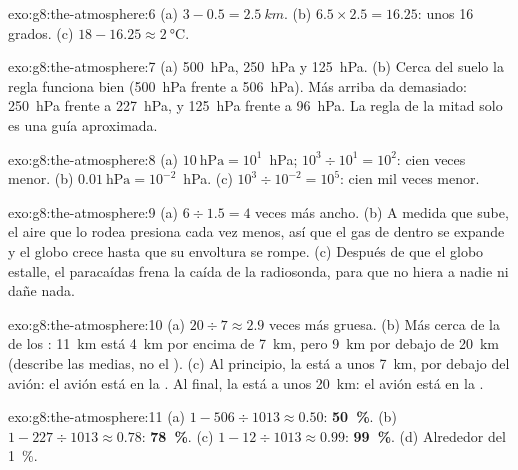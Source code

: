 \begin{solution}{exo:g8:the-atmosphere:6}
(a) $3 - 0.5 = \qty{2.5}{km}$. (b) $6.5 \times 2.5 = 16.25$: unos 16
grados. (c) $18 - 16.25 \approx \qty{2}{\degreeCelsius}$.
\end{solution}

\begin{solution}{exo:g8:the-atmosphere:7}
(a) \qty{500}{hPa}, \qty{250}{hPa} y \qty{125}{hPa}. (b) Cerca del suelo
la regla funciona bien (\qty{500}{hPa} frente a \qty{506}{hPa}). Más
arriba da demasiado: \qty{250}{hPa} frente a \qty{227}{hPa}, y
\qty{125}{hPa} frente a \qty{96}{hPa}. La regla de la mitad solo es una
guía aproximada.
\end{solution}

\begin{solution}{exo:g8:the-atmosphere:8}
(a) $10~\text{hPa} = 10^1$~hPa; $10^3 \div 10^1 = 10^2$: cien veces menor.
(b) $0.01~\text{hPa} = 10^{-2}$~hPa. (c) $10^3 \div 10^{-2} =
10^5$: cien mil veces menor.
\end{solution}

\begin{solution}{exo:g8:the-atmosphere:9}
(a) $6 \div 1.5 = 4$ veces más ancho. (b) A medida que sube, el aire que lo
rodea presiona cada vez menos, así que el gas de dentro se expande y el
globo crece hasta que su envoltura se rompe. (c) Después de que el globo
estalle, el paracaídas frena la caída de la radiosonda, para que no hiera
a nadie ni dañe nada.
\end{solution}

\begin{solution}{exo:g8:the-atmosphere:10}
(a) $20 \div 7 \approx 2.9$ veces más gruesa. (b) Más cerca de la de los
: \qty{11}{km} está \qty{4}{km} por encima de \qty{7}{km}, pero
\qty{9}{km} por debajo de \qty{20}{km} (describe las  medias, no
el ). (c) Al principio, la  está a unos \qty{7}{km}, por
debajo del avión: el avión está en la . Al final, la
 está a unos \qty{20}{km}: el avión está en la .
\end{solution}

\begin{solution}{exo:g8:the-atmosphere:11}
(a) $1 - 506 \div 1013 \approx 0.50$: \textbf{50~\%}. (b) $1 - 227 \div
1013 \approx 0.78$: \textbf{78~\%}. (c) $1 - 12 \div 1013 \approx 0.99$:
\textbf{99~\%}. (d) Alrededor del 1~\%.
\end{solution}

